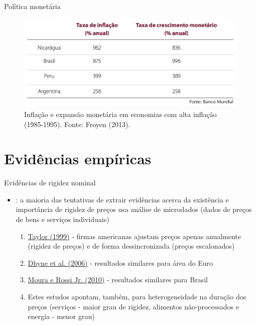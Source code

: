 \documentclass[10pt]{beamer}
\begin{document}
\begin{frame}
    {Política monetária}
    \begin{figure}
        \centering
        \includegraphics[width=\textwidth]{./figures/aula3_fig4.PNG}
        \caption{Inflação e expansão monetária em economias com alta inflação (1985-1995). Fonte: Froyen (2013).}
        \label{aula3_fig4}
    \end{figure}
\end{frame}

\section{Evidências empíricas}
\begin{frame}
    {Evidências de rigidez nominal}
    \begin{itemize}
        \item {}: a maioria das tentativas de extrair evidências acerca da existência e importância de rigidez de preços usa análise de microdados (dados de preços de bens e serviços individuais)\medskip
        \begin{enumerate}
            \item \href{https://doi.org/10.1016/S1574-0048(99)10023-5}{Taylor (1999)} - firmas americanas ajustam preços apenas anualmente (rigidez de preços) e de forma dessincronizada (preços escalonados)\medskip
            \item \href{https://www.aeaweb.org/articles?id=10.1257/jep.20.2.171}{Dhyne et al. (2006)} - resultados similares para área do Euro\medskip
            \item \href{https://www.scielo.br/j/ecoa/a/Z8hs38Gsyx3rTCxRyq3szRx/?lang=en}{Moura e Rossi Jr. (2010)} - resultados similares para Brasil\medskip
            \item Estes estudos apontam, também, para heterogeneidade na duração dos preços (serviços - maior grau de rigidez, alimentos não-processados e energia - menor grau)
        \end{enumerate}
    \end{itemize}
\end{frame}
\end{document}
